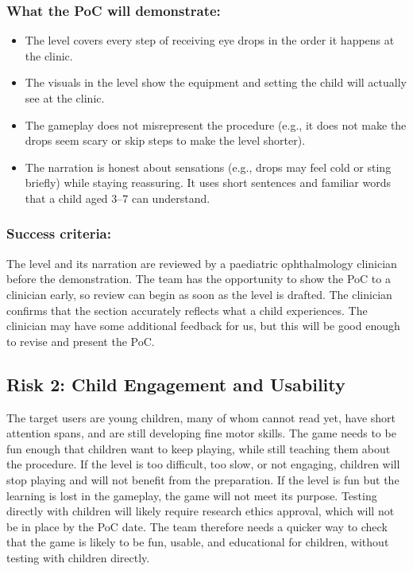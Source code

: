 \documentclass{article}
\begin{document}
\subsubsection*{What the PoC will demonstrate:}
\begin{itemize}
  \item The level covers every step of receiving eye drops in the order it
  happens at the clinic.
  \item The visuals in the level show the equipment and setting the child will
  actually see at the clinic.
  \item The gameplay does not misrepresent the procedure (e.g., it does not make
  the drops seem scary or skip steps to make the level shorter).
  \item The narration is honest about sensations (e.g., drops may feel cold or
  sting briefly) while staying reassuring. It uses short sentences and familiar
  words that a child aged 3--7 can understand.
\end{itemize}

\subsubsection*{Success criteria:}
The level and its narration are reviewed by a paediatric ophthalmology
clinician before the demonstration. The team has the opportunity to show the PoC
to a clinician early, so review can begin as soon as the level is drafted. The
clinician confirms that the section accurately reflects what a child
experiences. The clinician may have some additional feedback for us, but this
will be good enough to revise and present the PoC.

\subsection{Risk 2: Child Engagement and Usability}

The target users are young children, many of whom cannot read yet, have short
attention spans, and are still developing fine motor skills. The game needs to
be fun enough that children want to keep playing, while still teaching them
about the procedure. If the level is too difficult, too slow, or not engaging,
children will stop playing and will not benefit from the preparation. If the
level is fun but the learning is lost in the gameplay, the game will not meet
its purpose. Testing directly with children will likely require research ethics
approval, which will not be in place by the PoC date. The team therefore needs a
quicker way to check that the game is likely to be fun, usable, and educational
for children, without testing with children directly.
\end{document}
